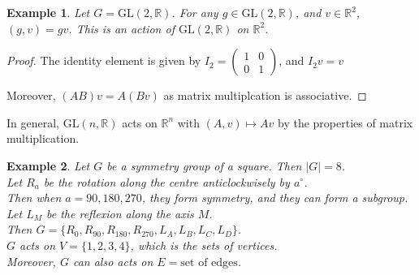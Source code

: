 \documentclass{article}
\theoremstyle{MyNonumberplain}
\theoremstyle{break}
\newtheorem*{proof}{Proof. }
\newcommand{\tmop}{\text}
\theoremstyle{break}
\newtheorem{example}{Example}[section]
\theoremstyle{break}
\theoremstyle{definition}
\theoremstyle{break}
\begin{document}
\begin{expbox}
    \begin{example}
        Let $G = \tmop{GL} (2, \mathbb{R})$. For any $g \in \tmop{GL} (2,
        \mathbb{R})$, and $v \in \mathbb{R}^2$, $(g, v) = g v$. This is an action of
        $\tmop{GL} (2, \mathbb{R})$ on $\mathbb{R}^2$.
    \end{example}
    \begin{prfbox}
        \begin{proof}
            The identity element is given by $I_2 = \left(\begin{array}{cc}
                1 & 0\\
                0 & 1
              \end{array}\right)$, and $I_2 v = v$
              
              Moreover, $(A B) v = A (B v)$ as matrix multiplcation is associative.
        \end{proof}
    \end{prfbox}
    In general, $\tmop{GL} (n, \mathbb{R})$ acts on $\mathbb{R}^n$ with $(A, v)
    \mapsto A v$ by the properties of matrix multiplication.
\end{expbox}

\begin{expbox}
    \begin{example}
        Let $G$ be a symmetry group of a square. Then $| G | = 8$.\\

        Let $R_a$ be the rotation along the centre anticlockwisely by $a^{\circ}$.\\

        Then when $a = 90, 180, 270$, they form symmetry, and they can form a
        subgroup.\\

        Let $L_M$ be the reflexion along the axis $M$.\\

        Then $G = \{ R_0, R_{90}, R_{180}, R_{270}, L_A, L_B, L_C, L_D \}$.\\

        $G$ acts on $V = \{ 1, 2, 3, 4 \}$, which is the sets of vertices.\\

        Moreover, $G$ can also acts on $E = \text{set of edges}$.
    \end{example}
\end{expbox}
\end{document}
